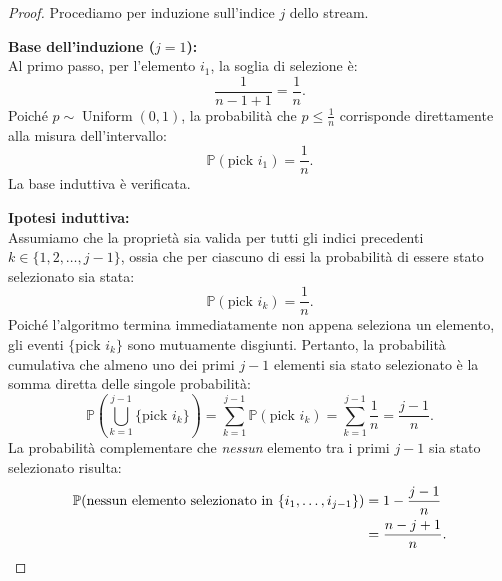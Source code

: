 \begin{proof}
Procediamo per induzione sull'indice $j$ dello stream.

\textbf{Base dell'induzione ($j = 1$):}\\
Al primo passo, per l'elemento $i_1$, la soglia di selezione è:
\begin{equation}
  \frac{1}{n - 1 + 1} = \frac{1}{n}.
\end{equation}
Poiché $p \sim \operatorname{Uniform}(0, 1)$, la probabilità che $p \le \frac{1}{n}$ corrisponde direttamente alla misura dell'intervallo:
\begin{equation}
  \mathbb{P}(\text{pick } i_1) = \frac{1}{n}.
\end{equation}
La base induttiva è verificata.

\textbf{Ipotesi induttiva:}\\
Assumiamo che la proprietà sia valida per tutti gli indici precedenti $k \in \{1, 2, \dots, j - 1\}$, ossia che per ciascuno di essi la probabilità di essere stato selezionato sia stata:
\begin{equation}
  \mathbb{P}(\text{pick } i_k) = \frac{1}{n}.
\end{equation}
Poiché l'algoritmo termina immediatamente non appena seleziona un elemento, gli eventi $\{\text{pick } i_k\}$ sono mutuamente disgiunti. Pertanto, la probabilità cumulativa che almeno uno dei primi $j - 1$ elementi sia stato selezionato è la somma diretta delle singole probabilità:
\begin{equation}
  \mathbb{P}\left(\bigcup_{k=1}^{j-1} \{\text{pick } i_k\}\right) = \sum_{k=1}^{j-1} \mathbb{P}(\text{pick } i_k) = \sum_{k=1}^{j-1} \frac{1}{n} = \frac{j - 1}{n}.
\end{equation}
La probabilità complementare che \emph{nessun} elemento tra i primi $j - 1$ sia stato selezionato risulta:
\begin{align}
  \mathbb{P}(\text{nessun elemento selezionato in } \{i_1, \dots, i_{j-1}\}) &= 1 - \frac{j - 1}{n} \notag\\
  &= \frac{n - j + 1}{n}.
  \label{eq:prob-none-selected-before}
\end{align}


\end{proof}
